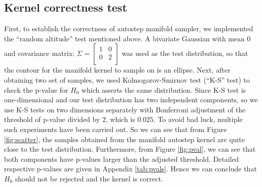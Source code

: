 \documentclass{article}
\begin{document}
\subsection{Kernel correctness test}
First, to establish the correctness of autostep manifold sampler, we implemented the ``random altitude'' test mentioned above. A bivariate Gaussian with mean $0$ and covariance matrix: $\Sigma = \begin{bmatrix}
1 & 0\\
0 & 2\\
\end{bmatrix}$ was used as the test distribution, so that the contour for the manifold kernel to sample on is an ellipse. Next, after obtaining two set of samples, we used Kolmogorov-Smirnov test (``K-S'' test) to check the p-value for $H_0$ which asserts the same distribution. Since K-S test is one-dimensional and our test distribution has two independent components, so we use K-S tests on two dimensions separately with Bonferroni adjustment of the threshold of p-value divided by $2$, which is $0.025$. To avoid bad luck, multiple such experiments have been carried out. So we can see that from Figure \ref{fig:scatter}, the samples obtained from the manifold autostep kernel are quite close to the test distribution. Furthermore, from Figure \ref{fig:pval}, we can see that both components have p-values larger than the adjusted threshold. Detailed respective p-values are given in Appendix \ref{tab:pvals}. Hence we can conclude that $H_0$ should not be rejected and the kernel is correct.
\end{document}
